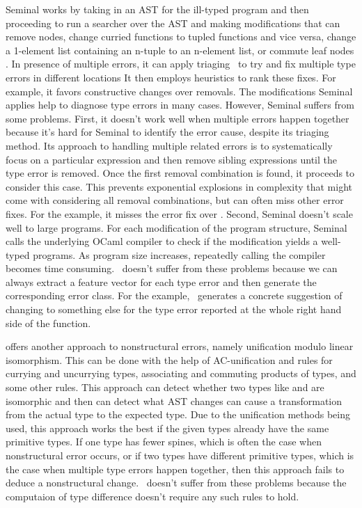 \documentclass[12pt]{report}	%
\begin{document}
Seminal works by taking in an AST for the ill-typed program
and then proceeding to run a searcher over the AST and
making modifications that can remove nodes, change curried functions
to tupled functions and vice versa, change a 1-element list containing an n-tuple to an n-element list, or commute leaf nodes \cite{Lerner07:STM}.
In presence of multiple errors, it can apply triaging~\cite{Lerner07:STM}
to try and fix multiple type errors in different locations
It then employs heuristics to rank
these fixes. For example, it favors constructive changes over removals.
The modifications Seminal applies help to diagnose type
errors in many cases. However, Seminal suffers from
some problems. First, it doesn't work well when multiple errors
happen together because it's hard for Seminal to identify the error
cause, despite its triaging method.
%
Its approach to handling
multiple related errors is to systematically focus on a particular
expression and then remove sibling expressions until the type
error is removed. Once the first removal combination is found, it
proceeds to consider this case.
This prevents exponential explosions in complexity
that might come with considering all removal combinations,
but can often miss other error fixes. For the  
example, it misses the error fix over .
%
Second, Seminal doesn't scale well to large programs.
For each modification of the program structure, Seminal calls
the underlying OCaml compiler to check if the modification yields
a well-typed programs. As program size increases, repeatedly calling
the compiler becomes time consuming.
%
\newCompiler\ doesn't suffer from these problems because
we can always extract a feature vector for each type error and
then generate the corresponding error class. 
For the  example,
\newCompiler\ generates a concrete suggestion of changing \prog{++}
to something else for the type error reported at the whole right
hand side of the function.

\cite{McAdam02:RTE} offers another approach to nonstructural errors, namely
unification modulo linear isomorphism.
This can be done with the help of AC-unification and rules for
currying and uncurrying types, associating and
commuting products of types, and some other rules.
This approach can detect whether two types like
 and  are isomorphic and then can detect what AST changes
can cause a transformation from the actual type to the expected type.
Due to the unification methods being used, this
approach works the best if the given types already have the same
primitive types. If one type has fewer spines, which is often the
case when nonstructural error occurs, or if two types have different
primitive types, which is the case when multiple type errors happen
together, then this approach fails to deduce a nonstructural change.
%
\newCompiler\ doesn't suffer from these problems because the computaion
of type difference doesn't require any such rules to hold.
\end{document}

